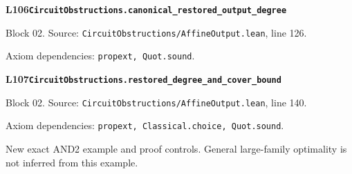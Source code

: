 \begin{minipage}{\linewidth}
\hypertarget{L106}{}
{\small\sffamily\bfseries\color{ink}L106\quad\nolinkurl{CircuitObstructions.canonical_restored_output_degree}}\par
{\scriptsize\sffamily\color{muted}Block 02. Source: \nolinkurl{CircuitObstructions/AffineOutput.lean}, line 126.}\par
{}
{\scriptsize\sffamily\color{muted}Axiom dependencies: \nolinkurl{propext, Quot.sound}.}
\end{minipage}\par\medskip
\begin{minipage}{\linewidth}
\hypertarget{L107}{}
{\small\sffamily\bfseries\color{ink}L107\quad\nolinkurl{CircuitObstructions.restored_degree_and_cover_bound}}\par
{\scriptsize\sffamily\color{muted}Block 02. Source: \nolinkurl{CircuitObstructions/AffineOutput.lean}, line 140.}\par
{}
{\scriptsize\sffamily\color{muted}Axiom dependencies: \nolinkurl{propext, Classical.choice, Quot.sound}.}
\end{minipage}\par\medskip
{}
New exact AND2 example and proof controls. General large-family optimality is not inferred from this example.
\par\medskip

